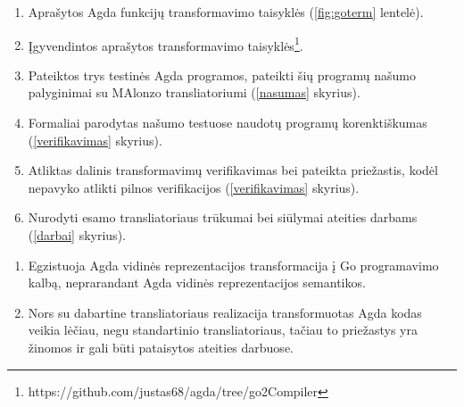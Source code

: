 \documentclass{VUMIFPSbakalaurinis}
\begin{document}
\begin{enumerate}[noitemsep]
  \item Aprašytos Agda funkcijų transformavimo taisyklės (\ref{fig:goterm} lentelė).
  \item Įgyvendintos aprašytos transformavimo taisyklės\footnote{https://github.com/justas68/agda/tree/go2Compiler}.
  \item Pateiktos trys testinės Agda programos, pateikti šių programų našumo palyginimai su MAlonzo transliatoriumi (\ref{nasumas} skyrius).
  \item Formaliai parodytas našumo testuose naudotų programų korenktiškumas (\ref{verifikavimas} skyrius).
  \item Atliktas dalinis transformavimų verifikavimas bei pateikta priežastis, kodėl nepavyko atlikti pilnos verifikacijos (\ref{verifikavimas} skyrius).
  \item Nurodyti esamo transliatoriaus trūkumai bei siūlymai ateities darbams (\ref{darbai} skyrius).
\end{enumerate}
\begin{enumerate}[noitemsep]
  \item Egzistuoja Agda vidinės reprezentacijos transformacija į Go programavimo kalbą, neprarandant Agda vidinės reprezentacijos semantikos.
  \item Nors su dabartine transliatoriaus realizacija transformuotas Agda kodas veikia lėčiau, negu standartinio transliatoriaus, tačiau to priežastys yra žinomos ir gali būti pataisytos ateities darbuose.
\end{enumerate}

\printbibliography[heading=bibintoc] 

\appendix  %
\end{document}
